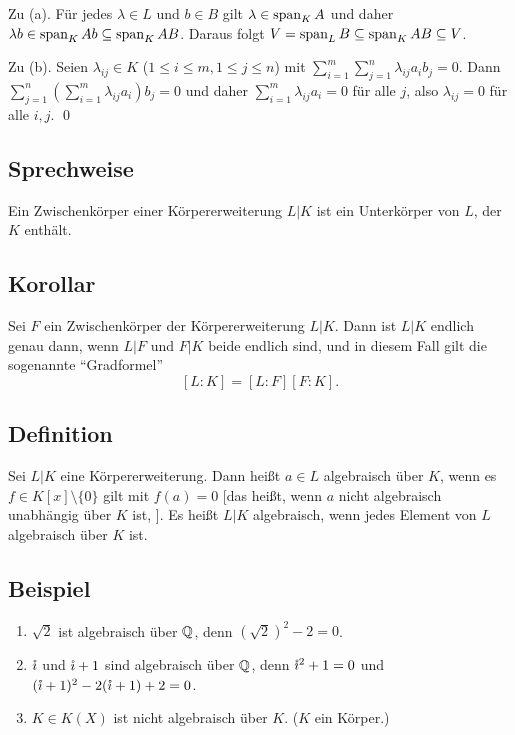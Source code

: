 Zu (a). Für jedes $\lambda \in L$ und $b \in B$ gilt $\lambda \in \operatorname{span}_K A$ und daher $\lambda b \in \operatorname{span}_K Ab \subseteq \operatorname{span}_K AB$. Daraus folgt $V = \operatorname{span}_L B \subseteq \operatorname{span}_K AB \subseteq V$.

Zu (b). Seien $\lambda_{ij} \in K$ ($1 \leq i \leq m, 1 \leq j \leq n$) mit $\sum_{i=1}^m  \sum_{j=1}^n \lambda_{ij} a_i b_j = 0$. Dann $\sum_{j=1}^n \left( \sum_{i=1}^m \lambda_{ij} a_i \right) b_j = 0$ und daher $\sum_{i=1}^m \lambda_{ij} a_i = 0$ für alle $j$, also $\lambda_{ij} = 0$ für alle $i,j$. \qed

\subsection{Sprechweise} Ein Zwischenkörper einer Körpererweiterung $L|K$ ist ein Unterkörper von $L$, der $K$ enthält.

\subsection{Korollar} Sei $F$ ein Zwischenkörper der Körpererweiterung $L|K$. Dann ist $L|K$ endlich genau dann, wenn $L|F$ und $F|K$ beide endlich sind, und in diesem Fall gilt die sogenannte "`Gradformel"' $$[L:K] = [L:F][F:K].$$

\subsection{Definition} Sei $L|K$ eine Körpererweiterung. Dann heißt $a \in L$ algebraisch über $K$, wenn es $f \in K[x]\setminus\{0\}$ gilt mit $f(a)=0$ [das heißt, wenn $a$ nicht algebraisch unabhängig über $K$ ist, \ALref{\ref{fixed:2.2.3(a)}}]. Es heißt $L|K$ algebraisch, wenn jedes Element von $L$ algebraisch über $K$ ist.

\subsection{Beispiel}
\begin{enumerate}[label=(\alph*)]
	\item
		$\sqrt{2}$ ist algebraisch über $\mathbb Q$, denn $\left(\sqrt{2}\right)^2-2 = 0$.
		
	\item
		$\mathring\imath$ und $\mathring\imath+1$ sind algebraisch über $\mathbb Q$, denn $\mathring\imath^2+1 = 0$ und $(\mathring\imath+1)^2-2(\mathring\imath+1)+2 = 0$.
		
	\item
		$K \in K(X)$ ist nicht algebraisch über $K$. ($K$ ein Körper.)
\end{enumerate}

